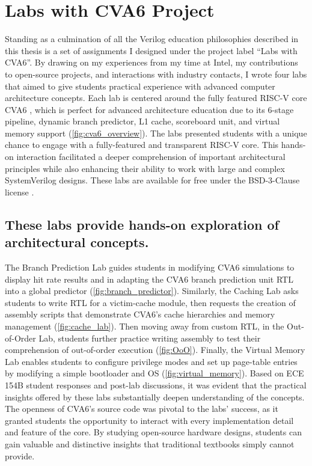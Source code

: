 
\chapter{Labs with CVA6 Project}
\label{chapter:labs_with_cva6}



Standing as a culmination of all the Verilog education philosophies described in this thesis is a set of assignments I designed under the project label \enquote{Labs with CVA6}. By drawing on my experiences from my time at Intel, my contributions to open-source projects, and interactions with industry contacts, I wrote four labs that aimed to give students practical experience with advanced computer architecture concepts. Each lab is centered around the fully featured RISC-V core CVA6 \cite{cva6}, which is perfect for advanced architecture education due to its 6-stage pipeline, dynamic branch predictor, L1 cache, scoreboard unit, and virtual memory support (\autoref{fig:cva6_overview}). The labs presented students with a unique chance to engage with a fully-featured and transparent RISC-V core. This hands-on interaction facilitated a deeper comprehension of important architectural principles while also enhancing their ability to work with large and complex SystemVerilog designs. These labs are available for free under the BSD-3-Clause license \cite{labsWithCVA6}.

\FloatBarrier

\section{These labs provide hands-on exploration of architectural concepts.}






The Branch Prediction Lab guides students in modifying CVA6 simulations to display hit rate results and in adapting the CVA6 branch prediction unit RTL into a global predictor (\autoref{fig:branch_predictor}). Similarly, the Caching Lab asks students to write RTL for a victim-cache module, then requests the creation of assembly scripts that demonstrate CVA6's cache hierarchies and memory management (\autoref{fig:cache_lab}). Then moving away from custom RTL, in the Out-of-Order Lab, students further practice writing assembly to test their comprehension of out-of-order execution (\autoref{fig:OoO}). Finally, the Virtual Memory Lab enables students to configure privilege modes and set up page-table entries by modifying a simple bootloader and OS (\autoref{fig:virtual_memory}). Based on ECE 154B student responses and post-lab discussions, it was evident that the practical insights offered by these labs substantially deepen understanding of the concepts. The openness of CVA6's source code was pivotal to the labs' success, as it granted students the opportunity to interact with every implementation detail and feature of the core. By studying open-source hardware designs, students can gain valuable and distinctive insights that traditional textbooks simply cannot provide.

